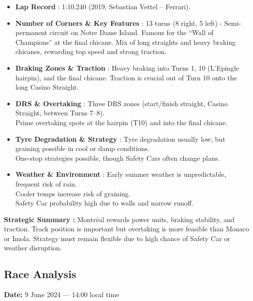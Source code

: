 \begin{itemize}
    \item \textbf{Lap Record} : 1:10.240 (2019, Sebastian Vettel – Ferrari).
    
    \item \textbf{Number of Corners \& Key Features} : 13 turns (8 right, 5 left) - Semi-permanent circuit on Notre Dame Island. Famous for the “Wall of Champions” at the final chicane. Mix of long straights and heavy braking chicanes, rewarding top speed and strong traction.
    
    \item \textbf{Braking Zones \& Traction} : Heavy braking into Turns 1, 10 (L’Epingle hairpin), and the final chicane. Traction is crucial out of Turn 10 onto the long Casino Straight.
    
    \item \textbf{DRS \& Overtaking} : Three DRS zones (start/finish straight, Casino Straight, between Turns 7–8). \\
    Prime overtaking spots at the hairpin (T10) and into the final chicane.
    
    \item \textbf{Tyre Degradation \& Strategy} : Tyre degradation usually low, but graining possible in cool or damp conditions. \\
    One-stop strategies possible, though Safety Cars often change plans.
    
    \item \textbf{Weather \& Environment} : Early summer weather is unpredictable, frequent risk of rain. \\
    Cooler temps increase risk of graining. \\
    Safety Car probability high due to walls and narrow runoff.
\end{itemize}

\textbf{Strategic Summary :}
Montréal rewards power units, braking stability, and traction. Track position is important but overtaking is more feasible than Monaco or Imola. Strategy must remain flexible due to high chance of Safety Car or weather disruption.


\subsection{Race Analysis}

\textbf{Date:} 9 June 2024 — 14:00 local time 


